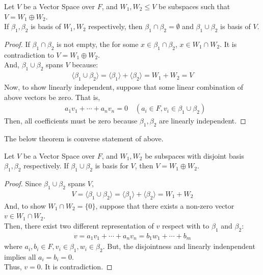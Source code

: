 \begin{theorem}
    Let $V$ be a Vector Space over $F$, and $W_1, W_2 \leq V$ be subspaces such that $V = W_1 \oplus W_2$. \\
    If $\beta_1, \beta_2$ is basis of $W_1, W_2$ respectively, then $\beta_1 \cap \beta_2 = \emptyset$ and $\beta_1 \cup \beta_2$ is basis of $V$.
\end{theorem}
\begin{proof}
    If $\beta_1 \cap \beta_2$ is not empty, the for some $x \in \beta_1 \cap \beta_2$, $x \in W_1 \cap W_2$. It is contradiction to $V = W_1 \oplus W_2$. \\
    And, $\beta_1 \cup \beta_2$ spans $V$ because:
    \begin{align*}
        \langle \beta_1 \cup \beta_2 \rangle = \langle \beta_1 \rangle + \langle \beta_2 \rangle = W_1 + W_2 = V
    \end{align*}
    Now, to show linearly independent, suppose that some linear combination of above vectors be zero. That is,
    \begin{align*}
        &a_1 v_1 + \cdots + a_n v_n = 0 \quad (a_i \in F, v_i \in \beta_1 \cup \beta_2)
    \end{align*}
    Then, all coefficients must be zero because $\beta_1, \beta_2$ are linearly independent.
\end{proof}
The below theorem is converse statement of above.
\begin{theorem}
    Let $V$ be a Vector Space over $F$, and $W_1, W_2$ be subspaces with disjoint basis $\beta_1, \beta_2$ respectively.
    If $\beta_1 \cup \beta_2$ is basis for $V$, then $V = W_1 \oplus W_2$. 
\end{theorem}
\begin{proof}
    Since $\beta_1 \cup \beta_2$ spans $V$, 
    \begin{align*}
        V = \langle \beta_1 \cup \beta_2 \rangle = \langle \beta_1 \rangle + \langle \beta_2 \rangle = W_1 + W_2
    \end{align*}
    And, to show $W_1 \cap W_2 = \{0\}$, suppose that there exists a non-zero vector $v \in W_1 \cap W_2$. \\
    Then, there exist two different representation of $v$ respect with to $\beta_1$ and $\beta_2$:
    \begin{align*}
        v = a_1 v_1 + \cdots + a_n v_n = b_1 w_1 + \cdots + b_m 
    \end{align*}
    where $a_i, b_i \in F, v_i \in \beta_1, w_i \in \beta_2$. But, the disjointness and linearly indenpendent implies all $a_i = b_i = 0$. \\
    Thus, $v = 0$. It is contradiction.
\end{proof}

